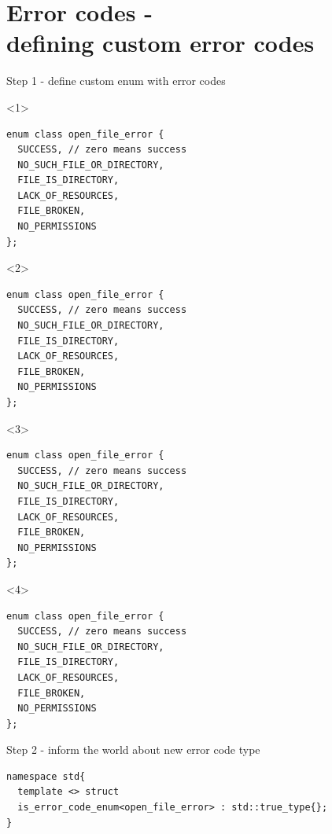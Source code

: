 \documentclass[10pt]{beamer}
\begin{document}
\section{Error codes - \\ defining custom error codes}

\begin{frame}[fragile]{Step 1 - define custom enum with error codes}
	\begin{onlyenv}
	\begin{verbatim}
enum class open_file_error {
  SUCCESS, // zero means success
  NO_SUCH_FILE_OR_DIRECTORY,
  FILE_IS_DIRECTORY,
  LACK_OF_RESOURCES,
  FILE_BROKEN,
  NO_PERMISSIONS
};
	\end{verbatim}
	\end{onlyenv}

	\begin{onlyenv}
	\begin{verbatim}
enum class open_file_error {
  SUCCESS, // zero means success
  NO_SUCH_FILE_OR_DIRECTORY,
  FILE_IS_DIRECTORY,
  LACK_OF_RESOURCES,
  FILE_BROKEN,
  NO_PERMISSIONS
};
\end{verbatim}
	\end{onlyenv}

	\begin{onlyenv}
	\begin{verbatim}
enum class open_file_error {
  SUCCESS, // zero means success
  NO_SUCH_FILE_OR_DIRECTORY,
  FILE_IS_DIRECTORY,
  LACK_OF_RESOURCES,
  FILE_BROKEN,
  NO_PERMISSIONS
};
\end{verbatim}
	\end{onlyenv}

	\begin{onlyenv}
	\begin{verbatim}
enum class open_file_error {
  SUCCESS, // zero means success
  NO_SUCH_FILE_OR_DIRECTORY,
  FILE_IS_DIRECTORY,
  LACK_OF_RESOURCES,
  FILE_BROKEN,
  NO_PERMISSIONS
};
\end{verbatim}
	\end{onlyenv}

\end{frame}

\begin{frame}[fragile]{Step 2 - inform the world about new error code type}
\begin{verbatim}
namespace std{
  template <> struct
  is_error_code_enum<open_file_error> : std::true_type{};
}
\end{verbatim}
	
\end{frame}
\end{document}
